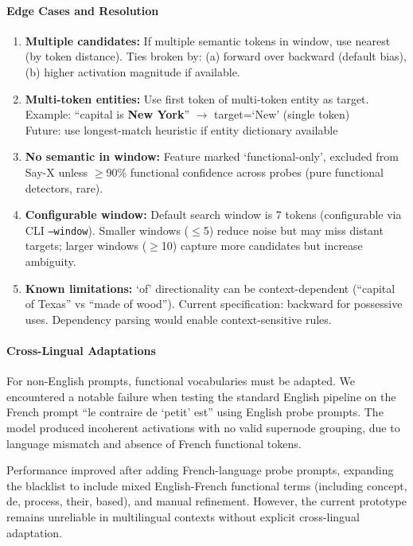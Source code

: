 \paragraph{Edge Cases and Resolution}
\begin{enumerate}
  
  \item \textbf{Multiple candidates:} If multiple semantic tokens in window, use nearest (by token distance). Ties broken by: (a) forward over backward (default bias), (b) higher activation magnitude if available.

  \item \textbf{Multi-token entities:} Use first token of multi-token entity as target.\\
  Example: ``capital is \textbf{New York}'' $\rightarrow$ target=`New' (single token)\\
  Future: use longest-match heuristic if entity dictionary available

  \item \textbf{No semantic in window:} Feature marked `functional-only', excluded from Say-X unless $\ge$90\% functional confidence across probes (pure functional detectors, rare).

  \item \textbf{Configurable window:} Default search window is 7 tokens (configurable via CLI \texttt{--window}). Smaller windows ($\le$5) reduce noise but may miss distant targets; larger windows ($\ge$10) capture more candidates but increase ambiguity.
  
  \item \textbf{Known limitations:} `of' directionality can be context-dependent (``capital of Texas'' vs ``made of wood''). Current specification: backward for possessive uses. Dependency parsing would enable context-sensitive rules.
\end{enumerate}

\paragraph{Cross-Lingual Adaptations}
For non-English prompts, functional vocabularies must be adapted. We encountered a notable failure when testing the standard English pipeline on the French prompt ``le contraire de `petit' est'' using English probe prompts. The model produced incoherent activations with no valid supernode grouping, due to language mismatch and absence of French functional tokens.

Performance improved after adding French-language probe prompts, expanding the blacklist to include mixed English-French functional terms (including concept, de, process, their, based), and manual refinement. However, the current prototype remains unreliable in multilingual contexts without explicit cross-lingual adaptation.

